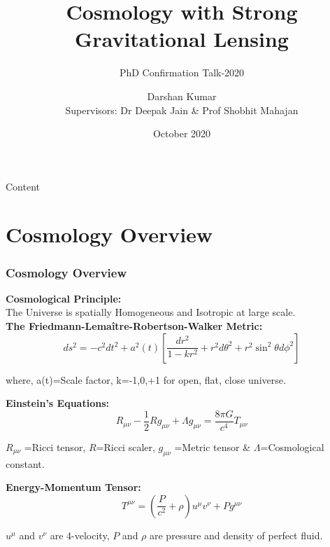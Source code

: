 \documentclass[xcolor=table,bigger]{beamer}
\title{Cosmology with Strong Gravitational Lensing}
\author{Darshan Kumar\\Supervisors: Dr Deepak Jain \& Prof Shobhit Mahajan}
\date{October 2020}
\institute{\vskip1ex Department of Physics \& Astrophysics\\ \vskip-1ex University of Delhi}
\subtitle{PhD Confirmation Talk-2020}
\begin{document}
\maketitle
{}
\begin{frame}{Content}{}
\tableofcontents
\end{frame}

\section{ Cosmology Overview}
\begin{frame}
 \frametitle{Cosmology Overview}
 \vspace{3mm}
 \textbf{ Cosmological Principle:} \\
The Universe is spatially Homogeneous and Isotropic at large scale.
\vspace{2mm}\\
 \textbf{ The Friedmann-Lema\^{i}tre-Robertson-Walker Metric:}
$$d s^{2}=-c^{2} d t^{2}+a^{2}(t)\left[\dfrac{d r^{2}}{1-k r^{2}}+r^{2} d \theta^{2}+r^{2} \sin ^{2} \theta d \phi^{2}\right]$$
\begin{flushright}
{\scriptsize where, a(t)=Scale factor, k=-1,0,+1 for open, flat, close universe.}
\end{flushright}
\vspace{2mm}
 \textbf{ Einstein’s Equations:}
 $$
 R_{\mu \nu}-\dfrac{1}{2} R g_{\mu \nu}+\Lambda g_{\mu \nu}=\dfrac{8 \pi G}{c^{4}} T_{\mu \nu}
 $$
 \begin{flushright}
 {\scriptsize $R_{\mu\nu}$ =Ricci tensor, $R$=Ricci scaler, $g_{\mu\nu}$ =Metric tensor \& $\Lambda$=Cosmological constant.}
 \end{flushright}
 \vspace{2mm}
\textbf{ Energy-Momentum Tensor:}
$$
T^{\mu \nu}=(\dfrac{P}{c^2}+\rho) u^{\mu} v^{\nu}+Pg^{\mu \nu}
$$
\begin{flushright}
\begin{scriptsize}
$u^\mu$ and $v^\nu$ are 4-velocity, $P$ and $\rho$ are pressure and density of perfect fluid.
\end{scriptsize}
\end{flushright}
\end{frame}
\end{document}
